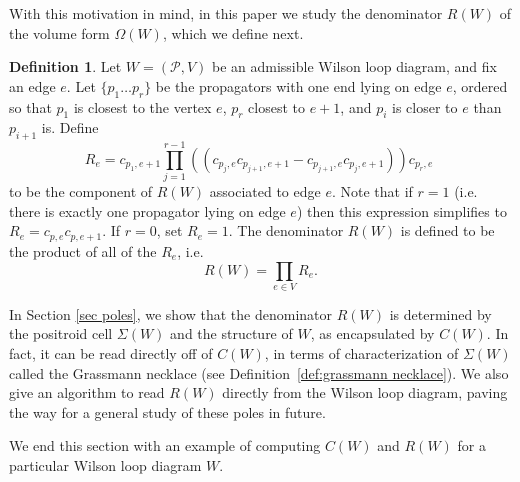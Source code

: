 \documentclass[11pt]{article}
\newcommand{\cP}{\mathcal{P}}
\theoremstyle{remark}
\theoremstyle{definition}
\newtheorem{dfn}[thm]{Definition}
\begin{document}
With this motivation in mind, in this paper we study the denominator $R(W)$ of the volume form $\Omega(W)$, which we define next.

\begin{dfn}\label{def R(W)}
Let $W = (\cP,V)$ be an admissible Wilson loop diagram, and fix an edge $e$. Let $\{p_1 \ldots p_r\}$ be the propagators with one end lying on edge $e$, ordered so that $p_1$ is closest to the vertex $e$, $p_r$ closest to $e+1$, and $p_i$ is closer to $e$ than $p_{i+1}$ is. Define 
\[ R_e =  c_{p_1,e+1} \prod_{j= 1}^{r-1} \left((c_{p_j,e} c_{p_{j+1},e+1} - c_{p_{j+1},e} c_{p_{j},e+1} ) \right) c_{p_r,e}\;\]
to be the component of $R(W)$ associated to edge $e$. Note that if $r = 1$ (i.e. there is exactly one propagator lying on edge $e$) then this expression simplifies to $R_e = c_{p,e} c_{p,e+1}$. If $r=0$, set $R_e = 1$. The denominator $R(W)$ is defined to be the product of all of the $R_e$, i.e. 
\[R(W) = \prod_{e \in V} R_e.\]
\end{dfn}

In Section \ref{sec poles}, we show that the denominator $R(W)$ is determined by the positroid cell $\Sigma(W)$ and the structure of $W$, as encapsulated by $C(W)$. In fact, it can be read directly off of $C(W)$, in terms of characterization of $\Sigma(W)$ called the Grassmann necklace (see Definition~\ref{def:grassmann necklace}). We also give an algorithm to read $R(W)$ directly from the Wilson loop diagram, paving the way for a general study of these poles in future.

We end this section with an example of computing $C(W)$ and $R(W)$ for a particular Wilson loop diagram $W$.
\end{document}
